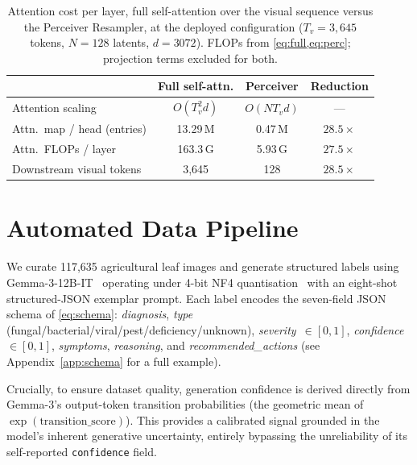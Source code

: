 \documentclass[runningheads]{llncs}
\begin{document}
\begin{table}[t]
  \centering
  \caption{Attention cost per layer, full self-attention over the visual
    sequence versus the Perceiver Resampler, at the deployed configuration
    ($T_v{=}3{,}645$ tokens, $N{=}128$ latents, $d{=}3072$).
    FLOPs from \cref{eq:full,eq:perc}; projection terms excluded for both.}
  \label{tab:complexity}
  \setlength{\tabcolsep}{8pt}
  \begin{tabular}{@{}lccc@{}}
    \toprule
    & \textbf{Full self-attn.} & \textbf{Perceiver} & \textbf{Reduction} \\
    \midrule
    Attention scaling            & $O(T_v^2 d)$ & $O(N T_v d)$ & --- \\
    Attn.\ map / head (entries)  & 13.29\,M     & 0.47\,M      & $28.5\times$ \\
    Attn.\ FLOPs / layer         & 163.3\,G     & 5.93\,G      & $27.5\times$ \\
    Downstream visual tokens     & 3{,}645      & 128          & $28.5\times$ \\
    \bottomrule
  \end{tabular}
\end{table}


\section{Automated Data Pipeline}
\label{sec:data}

We curate 117,635 agricultural leaf images and generate structured labels
using Gemma-3-12B-IT~\cite{gemmateam2025gemma3} operating under 4-bit NF4
quantisation~\cite{dettmers2024qlora} with an eight-shot structured-JSON exemplar prompt.
Each label encodes the seven-field JSON schema of \cref{eq:schema}: \emph{diagnosis}, \emph{type}
(fungal\slash bacterial\slash viral\slash pest\slash deficiency\slash unknown),
\emph{severity}~$\in[0,1]$,
\emph{confidence}~$\in[0,1]$, \emph{symptoms}, \emph{reasoning}, and
\emph{recommended\_actions} (see Appendix~\ref{app:schema} for a full example).

Crucially, to ensure dataset quality, generation confidence is derived directly from
Gemma-3's output-token transition probabilities (the geometric mean of
$\exp(\text{transition\_score})$). This provides a calibrated signal grounded in the
model's inherent generative uncertainty, entirely bypassing the unreliability of its
self-reported \texttt{confidence} field.
\end{document}
